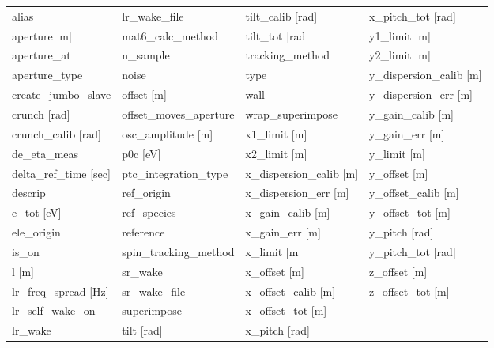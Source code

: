  \begin{tabular}{llll} \toprule
alias                            & lr_wake_file                     & tilt_calib [rad]                 & x_pitch_tot [rad]                \\
aperture [m]                     & mat6_calc_method                 & tilt_tot [rad]                   & y1_limit [m]                     \\
aperture_at                      & n_sample                         & tracking_method                  & y2_limit [m]                     \\
aperture_type                    & noise                            & type                             & y_dispersion_calib [m]           \\
create_jumbo_slave               & offset [m]                       & wall                             & y_dispersion_err [m]             \\
crunch [rad]                     & offset_moves_aperture            & wrap_superimpose                 & y_gain_calib [m]                 \\
crunch_calib [rad]               & osc_amplitude [m]                & x1_limit [m]                     & y_gain_err [m]                   \\
de_eta_meas                      & p0c [eV]                         & x2_limit [m]                     & y_limit [m]                      \\
delta_ref_time [sec]             & ptc_integration_type             & x_dispersion_calib [m]           & y_offset [m]                     \\
descrip                          & ref_origin                       & x_dispersion_err [m]             & y_offset_calib [m]               \\
e_tot [eV]                       & ref_species                      & x_gain_calib [m]                 & y_offset_tot [m]                 \\
ele_origin                       & reference                        & x_gain_err [m]                   & y_pitch [rad]                    \\
is_on                            & spin_tracking_method             & x_limit [m]                      & y_pitch_tot [rad]                \\
l [m]                            & sr_wake                          & x_offset [m]                     & z_offset [m]                     \\
lr_freq_spread [Hz]              & sr_wake_file                     & x_offset_calib [m]               & z_offset_tot [m]                 \\
lr_self_wake_on                  & superimpose                      & x_offset_tot [m]                 &                                  \\
lr_wake                          & tilt [rad]                       & x_pitch [rad]                    &                                  \\
 \bottomrule
 \end{tabular}
 \vfill
 
